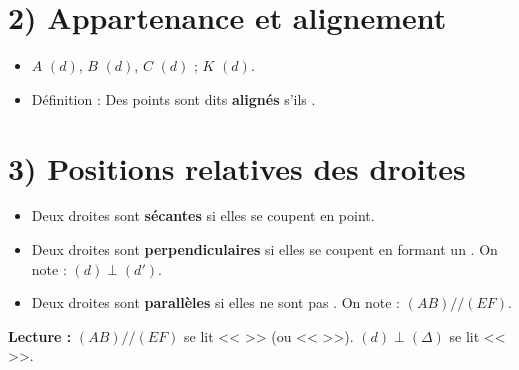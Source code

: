 
\section*{2) Appartenance et alignement}
\begin{itemize}[label = \textbullet]
	\item $A$ \trou{1cm} $(d)$, $B$ \trou{1cm} $(d)$, $C$ \trou{1cm} $(d)$ ; $K$ \trou{1cm} $(d)$.
	\item Définition : Des points sont dits \textbf{alignés} s'ils \trou{6cm}.
\end{itemize}

%

\section*{3) Positions relatives des droites}
\begin{itemize}
	\item Deux droites sont \textbf{sécantes} si elles se coupent en \trou{1.2cm} point.
	\item Deux droites sont \textbf{perpendiculaires} si elles se coupent en formant un \trou{1.5cm} \trou{1.5cm}. On note : $(d)\perp(d')$.
	\item Deux droites sont \textbf{parallèles} si elles ne sont pas \trou{2.2cm}. On note : $(AB)//(EF)$.
\end{itemize}

\textbf{Lecture :} $(AB)//(EF)$ se lit << \trou{5cm} >> (ou << \trou{5cm} >>). \quad $(d)\perp(\Delta)$ se lit << \trou{5cm} >>.



